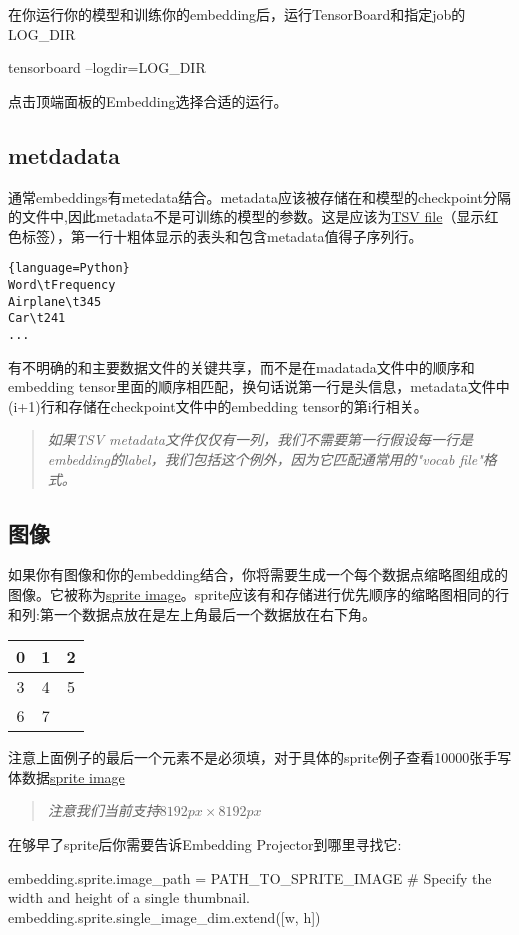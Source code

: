 在你运行你的模型和训练你的embedding后，运行TensorBoard和指定job的LOG\_DIR
\begin{python}
tensorboard --logdir=LOG_DIR
\end{python}
点击顶端面板的Embedding选择合适的运行。
\subsection{metdadata}
通常embeddings有metedata结合。metadata应该被存储在和模型的checkpoint分隔的文件中,因此metadata不是可训练的模型的参数。这是应该为\href{https://en.wikipedia.org/wiki/Tab-separated_values}{TSV file}（显示红色标签），第一行十粗体显示的表头和包含metadata值得子序列行。
\begin{lstlisting}{language=Python}
Word\tFrequency
Airplane\t345
Car\t241
...
\end{lstlisting}
有不明确的和主要数据文件的关键共享，而不是在madatada文件中的顺序和embedding tensor里面的顺序相匹配，换句话说第一行是头信息，metadata文件中(i+1)行和存储在checkpoint文件中的embedding tensor的第i行相关。
\begin{quote}
	\emph{如果TSV metadata文件仅仅有一列，我们不需要第一行假设每一行是embedding的label，我们包括这个例外，因为它匹配通常用的"vocab file"格式。}
\end{quote}
\subsection{图像}
如果你有图像和你的embedding结合，你将需要生成一个每个数据点缩略图组成的图像。它被称为\href{https://www.google.com/webhp#q=what+is+a+sprite+image}{sprite image}。sprite应该有和存储进行优先顺序的缩略图相同的行和列:第一个数据点放在是左上角最后一个数据放在右下角。

\begin{tabular}{|c|c|c|}
	\hline
	0&1&2\\
	\hline
	3&4&5\\
	\hline
	6&7&\\
	\hline
\end{tabular}

注意上面例子的最后一个元素不是必须填，对于具体的sprite例子查看10000张手写体数据\href{https://www.tensorflow.org/images/mnist_10k_sprite.png}{sprite image}
\begin{quote}
	\emph{注意我们当前支持$8192px\times8192px$}
\end{quote}
在够早了sprite后你需要告诉Embedding Projector到哪里寻找它:
\begin{python}
embedding.sprite.image_path = PATH_TO_SPRITE_IMAGE
	# Specify the width and height of a single thumbnail.
	embedding.sprite.single_image_dim.extend([w, h])
\end{python}
